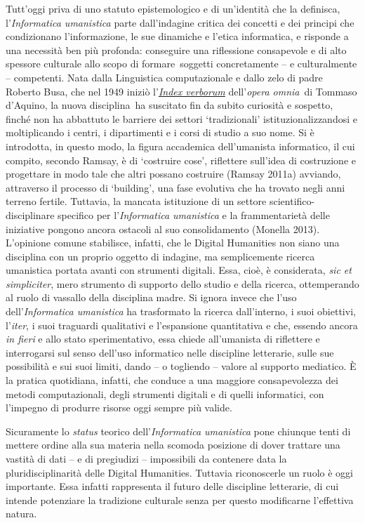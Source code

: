 {Tutt'oggi priva di uno statuto epistemologico e di un'identità che la
definisca, l'\emph{Informatica umanistica} parte dall'indagine critica
dei concetti e dei principi che condizionano l'informazione, le sue
dinamiche e l'etica informatica, e risponde a una necessità ben più
profonda: conseguire una riflessione consapevole e di alto spessore
culturale allo scopo di formare~soggetti concretamente -- e
culturalmente -- competenti. Nata dalla Linguistica computazionale e
dallo zelo di padre Roberto Busa, che nel 1949 iniziò
l'\href{http://www.corpusthomisticum.org/it/index.age}{\emph{Index
verborum}} dell'\emph{opera omnia}~di Tommaso d'Aquino, la nuova
disciplina~ha suscitato fin da subito curiosità e sospetto, finché non
ha abbattuto le barriere dei settori `tradizionali'
istituzionalizzandosi e moltiplicando i centri, i dipartimenti e i corsi
di studio a suo nome. Si è introdotta, in questo modo, la figura
accademica dell'umanista informatico, il cui compito, secondo Ramsay, è
di `costruire cose', riflettere sull'idea di costruzione e progettare in
modo tale che altri possano costruire (Ramsay 2011a) avviando,
attraverso il processo di `building', una fase evolutiva che ha trovato
negli anni terreno fertile. Tuttavia, la mancata istituzione di un
settore scientifico-disciplinare specifico per l'\emph{Informatica
umanistica} e la frammentarietà delle iniziative pongono ancora ostacoli
al suo consolidamento (Monella 2013). L'opinione comune stabilisce,
infatti, che le Digital Humanities non siano una disciplina con un
proprio oggetto di indagine, ma semplicemente ricerca umanistica portata
avanti con strumenti digitali. Essa, cioè, è considerata, \emph{sic et
simpliciter}, mero strumento di supporto dello studio e della ricerca,
ottemperando al ruolo di vassallo della disciplina madre. Si ignora
invece che l'uso dell'\emph{Informatica umanistica} ha trasformato la
ricerca dall'interno, i suoi obiettivi, l'\emph{iter}, i suoi traguardi
qualitativi e l'espansione quantitativa e che, essendo ancora \emph{in
fieri} e allo stato sperimentativo, essa chiede all'umanista di
riflettere e interrogarsi sul senso dell'uso informatico nelle
discipline letterarie, sulle sue possibilità e sui suoi limiti, dando --
o togliendo -- valore al supporto mediatico. È la pratica quotidiana,
infatti, che conduce a una maggiore consapevolezza dei metodi
computazionali, degli strumenti digitali e di quelli informatici, con
l'impegno di produrre risorse oggi sempre più valide.

Sicuramente lo \emph{status} teorico dell'\emph{Informatica umanistica}
pone chiunque tenti di mettere ordine alla sua materia nella scomoda
posizione di dover trattare una vastità di dati -- e di pregiudizi --
impossibili da contenere data la pluridisciplinarità delle Digital
Humanities. Tuttavia riconoscerle un ruolo è oggi importante. Essa
infatti rappresenta il futuro delle discipline letterarie, di cui
intende potenziare la tradizione culturale senza per questo modificarne
l'effettiva natura.

}
